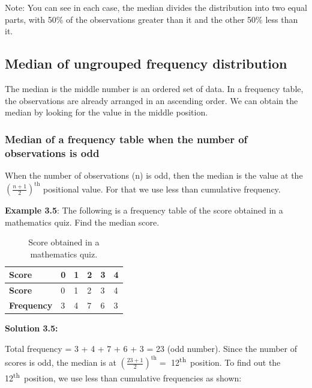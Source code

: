 \documentclass[
]{book}
\begin{document}
Note: You can see in each case, the median divides the distribution into
two equal parts, with 50\% of the observations greater than it and the
other 50\% less than it.

\hypertarget{median-of-ungrouped-frequency-distribution}{%
\subsection{Median of ungrouped frequency distribution}\label{median-of-ungrouped-frequency-distribution}}

The median is the middle number is an ordered set of data. In a
frequency table, the observations are already arranged in an ascending
order. We can obtain the median by looking for the value in the middle
position.

\hypertarget{median-of-a-frequency-table-when-the-number-of-observations-is-odd}{%
\subsubsection{Median of a frequency table when the number of observations is odd}\label{median-of-a-frequency-table-when-the-number-of-observations-is-odd}}

When the number of observations (n) is odd, then the median is the value
at the~\(\left( \frac{n + 1}{2} \right)^{\text{th}}\) positional value.
For that we use less than cumulative frequency.

\textbf{Example 3.5}: The following is a frequency table of the score obtained in a mathematics quiz. Find the median score.

\begin{longtable}[]{@{}llllll@{}}
\caption{\label{tab:score} Score obtained in a mathematics quiz.}\tabularnewline
\toprule
\textbf{Score} & 0 & 1 & 2 & 3 & 4 \\
\midrule
\endfirsthead
\toprule
\textbf{Score} & 0 & 1 & 2 & 3 & 4 \\
\midrule
\endhead
\textbf{Frequency} & 3 & 4 & 7 & 6 & 3 \\
\bottomrule
\end{longtable}

\textbf{Solution 3.5:}

Total frequency = 3 + 4 + 7 + 6 + 3 = 23 (odd number). Since the number
of scores is odd, the median is at
\(\left( \frac{23 + 1}{2} \right)^{\text{th}} =\) 12\textsuperscript{th}~position. To find
out the 12\textsuperscript{th}~position, we use less than cumulative frequencies as
shown:
\end{document}

